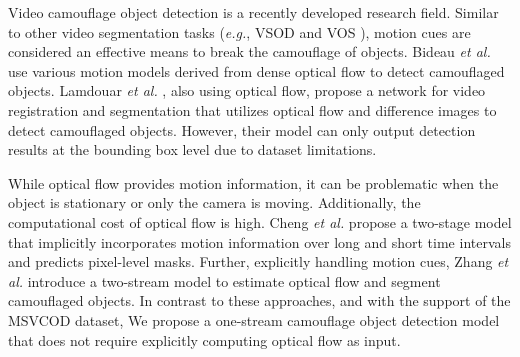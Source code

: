 Video camouflage object detection is a recently developed research field. Similar to other video segmentation tasks (\emph {e.g.}, VSOD \cite{lan2022siamese, gao2022weakly, ji2021full} and VOS \cite{hong2023simulflow, miao2024region, seong2022video, yang2022decoupling}), motion cues are considered an effective means to break the camouflage of objects. Bideau \emph {et al.} \cite{bideau2016s} use various motion models derived from dense optical flow to detect camouflaged objects. Lamdouar \emph {et al.} \cite{lamdouar2020betrayed}, also using optical flow, propose a network for video registration and segmentation that utilizes optical flow and difference images to detect camouflaged objects. However, their model can only output detection results at the bounding box level due to dataset limitations.

While optical flow \cite{deng2023explicit, teed2020raft, dosovitskiy2015flownet, sun2018pwc} provides motion information, it can be problematic when the object is stationary or only the camera is moving. Additionally, the computational cost of optical flow is high. Cheng \emph {et al.} \cite{cheng2022implicit} propose a two-stage model that implicitly incorporates motion information over long and short time intervals and predicts pixel-level masks. Further, explicitly handling motion cues, Zhang \emph {et al.} \cite{zhang2024explicit} introduce a two-stream model to estimate optical flow and segment camouflaged objects. In contrast to these approaches, and with the support of the MSVCOD dataset, We propose a one-stream camouflage object detection model that does not require explicitly computing optical flow as input.